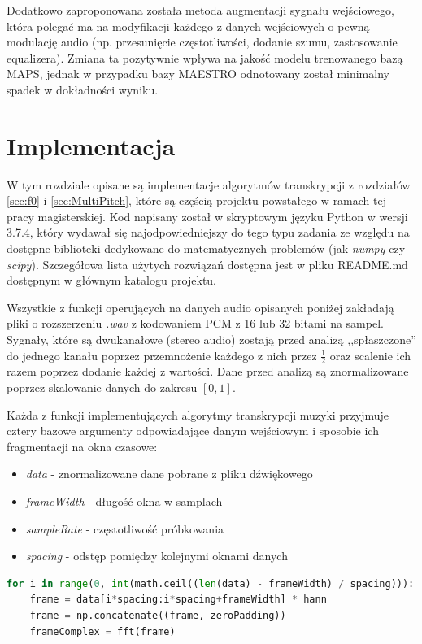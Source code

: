 \documentclass[12pt,a4paper,twoside]{mwart}
\begin{document}
Dodatkowo zaproponowana została metoda augmentacji sygnału wejściowego, która polegać ma na modyfikacji każdego z danych wejściowych o pewną modulację audio (np. przesunięcie częstotliwości, dodanie szumu, zastosowanie equalizera). Zmiana ta pozytywnie wpływa na jakość modelu trenowanego bazą MAPS, jednak w przypadku bazy MAESTRO odnotowany został minimalny spadek w dokładności wyniku. 

\newpage

\section{Implementacja}\label{sec:impl}
W tym rozdziale opisane są implementacje algorytmów transkrypcji z rozdziałów \ref{sec:f0} i \ref{sec:MultiPitch}, które są częścią projektu powstałego w ramach tej pracy magisterskiej. Kod napisany został w skryptowym języku Python w wersji 3.7.4, który wydawał się najodpowiedniejszy do tego typu zadania ze względu na dostępne biblioteki dedykowane do matematycznych problemów (jak \textit{numpy} czy \textit{scipy}). Szczegółowa lista użytych rozwiązań dostępna jest w pliku README.md dostępnym w głównym katalogu projektu.

Wszystkie z funkcji operujących na danych audio opisanych poniżej zakładają pliki  o rozszerzeniu \textit{.wav} z kodowaniem PCM z 16 lub 32 bitami na sampel. Sygnały, które są dwukanałowe (stereo audio) zostają przed analizą ,,spłaszczone'' do jednego kanału poprzez przemnożenie każdego z nich przez $\frac{1}{2}$ oraz scalenie ich razem poprzez dodanie każdej z wartości. Dane przed analizą są znormalizowane poprzez skalowanie danych do zakresu $\left[0, 1\right]$.

Każda z funkcji implementujących algorytmy transkrypcji muzyki przyjmuje cztery bazowe argumenty odpowiadające danym wejściowym i sposobie ich fragmentacji na okna czasowe:
\begin{itemize}
  \item \textit{data} - znormalizowane dane pobrane z pliku dźwiękowego
  \item \textit{frameWidth} - długość okna w samplach
  \item \textit{sampleRate} - częstotliwość próbkowania
  \item \textit{spacing} - odstęp pomiędzy kolejnymi oknami danych
\end{itemize}

\begin{lstlisting}[language=Python, caption={Przykład pętli po danych wejściowych z uwzględnieniem okna czasowego}, captionpos=b, label={code:iter}]
  for i in range(0, int(math.ceil((len(data) - frameWidth) / spacing))):
    frame = data[i*spacing:i*spacing+frameWidth] * hann
    frame = np.concatenate((frame, zeroPadding))
    frameComplex = fft(frame)
\end{lstlisting}
\end{document}
